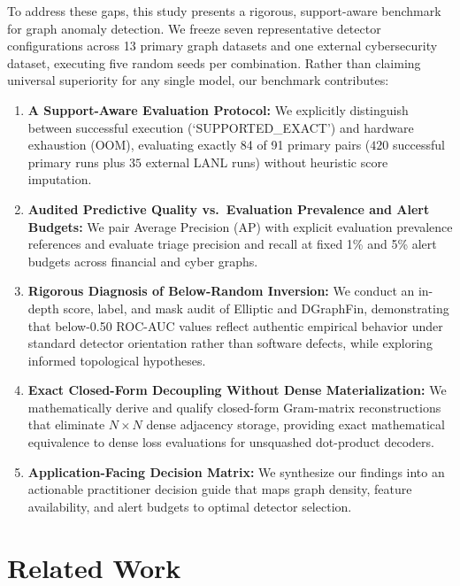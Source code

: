 \documentclass[applsci,article,submit,moreauthors,pdftex]{Definitions/mdpi}
\begin{document}
To address these gaps, this study presents a rigorous, support-aware benchmark for graph anomaly detection. We freeze seven representative detector configurations across 13 primary graph datasets and one external cybersecurity dataset, executing five random seeds per combination. Rather than claiming universal superiority for any single model, our benchmark contributes:
\begin{enumerate}
    \item \textbf{A Support-Aware Evaluation Protocol:} We explicitly distinguish between successful execution (`SUPPORTED\_EXACT') and hardware exhaustion (OOM), evaluating exactly 84 of 91 primary pairs ($420$ successful primary runs plus $35$ external LANL runs) without heuristic score imputation.
    \item \textbf{Audited Predictive Quality vs.\ Evaluation Prevalence and Alert Budgets:} We pair Average Precision (AP) with explicit evaluation prevalence references and evaluate triage precision and recall at fixed 1\% and 5\% alert budgets across financial and cyber graphs.
    \item \textbf{Rigorous Diagnosis of Below-Random Inversion:} We conduct an in-depth score, label, and mask audit of Elliptic and DGraphFin, demonstrating that below-0.50 ROC-AUC values reflect authentic empirical behavior under standard detector orientation rather than software defects, while exploring informed topological hypotheses.
    \item \textbf{Exact Closed-Form Decoupling Without Dense Materialization:} We mathematically derive and qualify closed-form Gram-matrix reconstructions that eliminate $N \times N$ dense adjacency storage, providing exact mathematical equivalence to dense loss evaluations for unsquashed dot-product decoders.
    \item \textbf{Application-Facing Decision Matrix:} We synthesize our findings into an actionable practitioner decision guide that maps graph density, feature availability, and alert budgets to optimal detector selection.
\end{enumerate}

\section{Related Work}
\label{sec:related}
\end{document}
